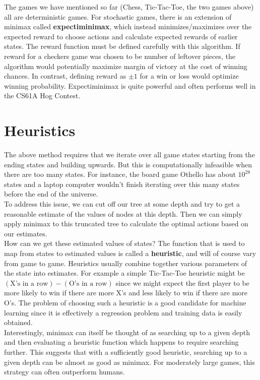 \documentclass[12pt, letterpaper]{article}
\begin{document}
The games we have mentioned so far (Chess, Tic-Tac-Toe, the two games above) all are deterministic games. For stochastic games, there is an extension of minimax called \textbf{expectiminimax}, which instead minimizes/maximizes over the expected reward to choose actions and calculate expected rewards of earlier states. The reward function must be defined carefully with this algorithm. If reward for a checkers game was chosen to be number of leftover pieces, the algorithm would potentially maximize margin of victory at the cost of winning chances. In contrast, defining reward as $\pm 1$ for a win or loss would optimize winning probability. Expectiminimax is quite powerful and often performs well in the CS61A Hog Contest.
\section*{Heuristics}
The above method requires that we iterate over all game states starting from the ending states and building upwards. But this is computationally infeasible when there are too many states. For instance, the board game Othello has about $10^{28}$ states and a laptop computer wouldn't finish iterating over this many states before the end of the universe. \\[0.2cm]
To address this issue, we can cut off our tree at some depth and try to get a reasonable estimate of the values of nodes at this depth. Then we can simply apply minimax to this truncated tree to calculate the optimal actions based on our estimates. \\[0.2cm]
How can we get these estimated values of states? The function that is used to map from states to estimated values is called a \textbf{heuristic}, and will of course vary from game to game. Heuristics usually combine together various parameters of the state into estimates. For example a simple Tic-Tac-Toe heuristic might be $(\text{X's in a row}) - (\text{O's in a row})$ since we might expect the first player to be more likely to win if there are more X's and less likely to win if there are more O's. The problem of choosing such a heuristic is a good candidate for machine learning since it is effectively a regression problem and training data is easily obtained. \\[0.2cm]
Interestingly, minimax can itself be thought of as searching up to a given depth and then evaluating a heuristic function which happens to require searching further. This suggests that with a sufficiently good heuristic, searching up to a given depth can be almost as good as minimax. For moderately large games, this strategy can often outperform humans.
\newpage
\end{document}
